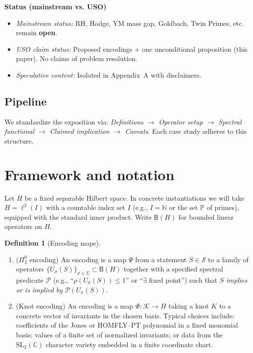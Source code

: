 \documentclass[11pt]{article}
\theoremstyle{definition}
\newtheorem{definition}[theorem]{Definition}
\theoremstyle{remark}
\newcommand{\N}{\mathbb{N}}
\newcommand{\C}{\mathbb{C}}
\newcommand{\PP}{\mathbb{P}} %
\newcommand{\1}{\mathbf{1}}
\newenvironment{statusbox}{%
  \begin{tcolorbox}
  \textbf{Status (mainstream vs. USO)}\\[-0.5em]
  \begin{itemize}[leftmargin=1.2em,itemsep=0.25em]
}{\end{itemize}\end{tcolorbox}}
\begin{document}
\begin{statusbox}
  \item \emph{Mainstream status:} RH, Hodge, YM mass gap, Goldbach, Twin Primes, etc. remain \textbf{open}.
  \item \emph{USO claim status:} Proposed encodings + one unconditional proposition (this paper). No claims of problem resolution.
  \item \emph{Speculative content:} Isolated in Appendix~A with disclaimers.
\end{statusbox}

\subsection*{Pipeline}
We standardize the exposition via: \emph{Definitions $\to$ Operator setup $\to$ Spectral functional $\to$ Claimed implication $\to$ Caveats}. Each case study adheres to this structure.

\section{Framework and notation}
Let $H$ be a fixed separable Hilbert space. In concrete instantiations we will take $H=\ell^2(I)$ with a countable index set $I$ (e.g., $I=\N$ or the set $\PP$ of primes), equipped with the standard inner product. Write $\mathsf{B}(H)$ for bounded linear operators on $H$.

\begin{definition}[Encoding maps]
\label{def:encodings}
\begin{enumerate}[label=(\alph*),leftmargin=2em]
  \item ($\Pi^0_2$ encoding) An encoding is a map $\Psi$ from a statement $S\in\mathcal{S}$ to a family of operators $\{U_{\sigma}(S)\}_{\sigma\in\Sigma}\subset \mathsf{B}(H)$ together with a specified spectral predicate $\mathcal{P}$ (e.g., ``$\rho(U_{\sigma}(S))\le 1$'' or ``$\exists$ fixed point'') such that $S$ \emph{implies or is implied by} $\mathcal{P}(U_{\sigma}(S))$.
  \item (Knot encoding) An encoding is a map $\Phi: \mathcal{K}\to H$ taking a knot $K$ to a concrete vector of invariants in the chosen basis. Typical choices include: coefficients of the Jones or HOMFLY--PT polynomial in a fixed monomial basis; values of a finite set of normalized invariants; or data from the $\mathrm{SL}_2(\C)$ character variety embedded in a finite coordinate chart.
\end{enumerate}
\end{definition}
\end{document}
